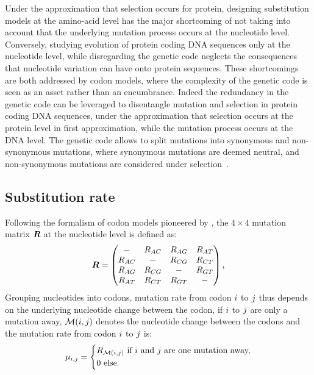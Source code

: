 Under the approximation that selection occurs for protein, designing \gls{substitution} models at the amino-acid level has the major shortcoming of not taking into account that the underlying mutation process occurs at the nucleotide level.
Conversely, studying evolution of protein coding \acrshort{DNA} sequences only at the nucleotide level, while disregarding the genetic code neglects the consequences that nucleotide variation can have onto protein sequences.
These shortcomings are both addressed by \gls{codon} models, where the complexity of the genetic code is seen as an asset rather than an encumbrance.
Indeed the redundancy in the genetic code can be leveraged to disentangle mutation and selection in protein coding \acrshort{DNA} sequences, under the approximation that selection occurs at the protein level in first approximation, while the mutation process occurs at the \acrshort{DNA} level.
The genetic code allows to split mutations into synonymous and non-synonymous mutations, where synonymous mutations are deemed \gls{neutral}, and non-synonymous mutations are considered under selection~\citep{Muse1994,Goldman1994}.

\subsection{Substitution rate}

Following the formalism of \gls{codon} models pioneered by \citet{Muse1994}, the $4 \times 4$ mutation matrix $\bm{R}$ at the nucleotide level is defined as:
\begin{equation}
    \label{eq:mutrates}
    \bm{R} = \begin{pmatrix}
                     - & {R_{AC}} &        {R_{AG}} &        {R_{AT}} \\
                     {R_{AC}} & - & {R_{CG}} &        {R_{CT}} \\
                     {R_{AG}} &        {R_{CG}} & - & {R_{GT}} \\
                     {R_{AT}} &        {R_{CT}} &        {R_{GT}} & -
    \end{pmatrix},
\end{equation}
Grouping nucleotides into \glspl{codon}, mutation rate from \gls{codon} ${i}$ to ${j}$ thus depends on the underlying nucleotide change between the \gls{codon}, if ${i}$ to ${j}$ are only a mutation away, $\mathcal{M}({i}, {j})$ denotes the nucleotide change between the \glspl{codon} and the mutation rate from \gls{codon} ${i}$ to ${j}$ is:
\begin{equation}
    \mu_{{i}, {j}} =
    \begin{dcases}
        R_{\mathcal{M}({i}, {j})} \text{ if ${i}$ and ${j}$ are one mutation away,} \\
        0 \text{ else.}
    \end{dcases}
\end{equation}

